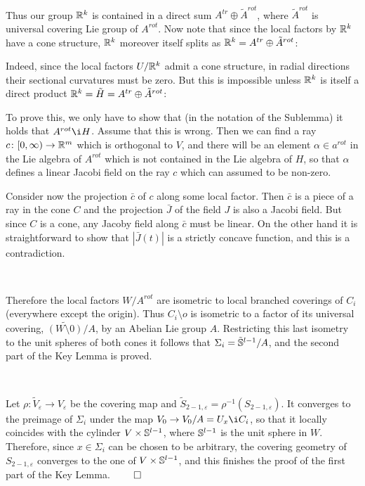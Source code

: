 \
 

Thus our group ${\Bbb R}^k$ is contained in a direct sum 
$A^{tr}\oplus \tilde A^{rot}$, where $\tilde A^{rot}$ is universal covering 
Lie group of 
$A^{rot}$.
Now note that since the local factors by ${\Bbb R}^k$ have a cone structure, 
${\Bbb R}^k$ moreover itself splits as ${\Bbb R}^k=A^{tr}\oplus \tilde A^{rot}$: 

Indeed,
since the local factors $U/{\Bbb R}^k$
admit a cone structure, in radial directions 
their sectional curvatures must be zero. 
But this is impossible unless ${\Bbb R}^k$ is itself a direct product 
${\Bbb R}^k= \tilde H= A^{tr}\oplus \tilde A^{rot}$:

To prove this, 
we only have to show that 
(in the notation of the Sublemma) it holds that $A^{rot}\i H$. 
Assume that this is wrong.
Then we can find a ray $c\colon [0,\infty)\to {\Bbb R}^m$ 
which is orthogonal to $V$, and there will be an element 
$\alpha\in a^{rot}$ in the Lie algebra of $A^{rot}$
which is not contained in the Lie algebra of $H$,
so that $\alpha$ defines a linear Jacobi field on the ray $c$
which can assumed to be non-zero.

Consider now the projection $\bar c$ of $c$ along some local factor. 
Then $\bar c$ is a piece of a ray in the cone $C$ and the
projection $\bar J$ of 
the field $J$ is also a Jacobi field. 
But since $C$ is a cone, any 
Jacoby field along $\bar c$ must be linear.
On the other hand it is straightforward to show that $|\bar J(t)|$ is a  
strictly concave function, and this is a contradiction.

 
\
 

Therefore the   
local factors $W/A^{rot}$ are isometric to local branched coverings
of $C_i$ (everywhere except the origin).
Thus
$C_i\setminus o$ is isometric to a factor of its universal covering,
$\widetilde{(W\setminus 0)}/A$, by an Abelian Lie group $A$.
Restricting this last isometry to the unit spheres of both cones 
it follows that $\Sigma_i=\tilde {{\Bbb S}}^{l-1}/A$, and 
the second part of the Key Lemma is proved.

\

Let $\rho\colon \widetilde V_\varepsilon\to V_\varepsilon$ be the covering map and
$\widetilde S_{2-1,\varepsilon}=\rho^{-1}(S_{2-1,\varepsilon})$.
It converges to the preimage of $\Sigma_i$  
under the map $V_0\to V_0/A=U_x\i C_i$, so that it locally coincides with
the cylinder  
$V\times {\Bbb S}^{l-1}$, where ${\Bbb S}^{l-1}$ is the unit sphere in $W$.   
Therefore, since $x\in\Sigma_i$ can be chosen to be arbitrary, the covering 
geometry of $S_{2-1,\varepsilon}$ converges to the one of $V\times {\Bbb S}^{l-1}$, 
and this finishes the proof of the first part of the Key Lemma.  $\qed$
 

